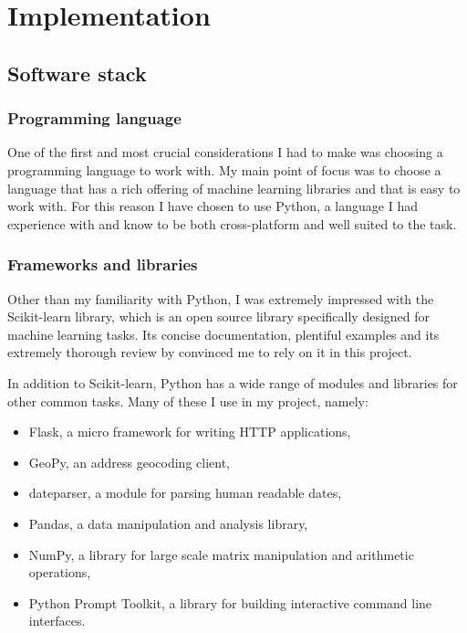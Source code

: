 \documentclass{article}
\begin{document}
	\section{Implementation}

	\subsection{Software stack}

	\subsubsection{Programming language}

	One of the first and most crucial considerations I had to make was choosing a programming language to work with. My main point of focus was to choose a language that has a rich offering of machine learning libraries and that is easy to work with. For this reason I have chosen to use Python, a language I had experience with and know to be both cross-platform and well suited to the task.

	\subsubsection{Frameworks and libraries}
	Other than my familiarity with Python, I was extremely impressed with the Scikit-learn library, which is an open source library specifically designed for machine learning tasks. Its concise documentation, plentiful examples and its extremely thorough review by \cite{sklearn_api} convinced me to rely on it in this project.

	In addition to Scikit-learn, Python has a wide range of modules and libraries for other common tasks. Many of these I use in my project, namely:

	\begin{itemize}
		\item Flask, a micro framework for writing HTTP applications,
		\item GeoPy, an address geocoding client,
		\item dateparser, a module for parsing human readable dates,
		\item Pandas, a data manipulation and analysis library,
		\item NumPy, a library for large scale matrix manipulation and arithmetic operations,
		\item Python Prompt Toolkit, a library for building interactive command line interfaces.
	\end{itemize}
\end{document}
